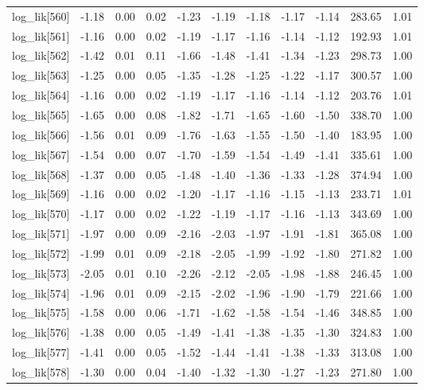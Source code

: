 \begin{table}[ht]
\begin{tabular}{rrrrrrrrrrr}
  log\_lik[560] & -1.18 & 0.00 & 0.02 & -1.23 & -1.19 & -1.18 & -1.17 & -1.14 & 283.65 & 1.01 \\ 
  log\_lik[561] & -1.16 & 0.00 & 0.02 & -1.19 & -1.17 & -1.16 & -1.14 & -1.12 & 192.93 & 1.01 \\ 
  log\_lik[562] & -1.42 & 0.01 & 0.11 & -1.66 & -1.48 & -1.41 & -1.34 & -1.23 & 298.73 & 1.00 \\ 
  log\_lik[563] & -1.25 & 0.00 & 0.05 & -1.35 & -1.28 & -1.25 & -1.22 & -1.17 & 300.57 & 1.00 \\ 
  log\_lik[564] & -1.16 & 0.00 & 0.02 & -1.19 & -1.17 & -1.16 & -1.14 & -1.12 & 203.76 & 1.01 \\ 
  log\_lik[565] & -1.65 & 0.00 & 0.08 & -1.82 & -1.71 & -1.65 & -1.60 & -1.50 & 338.70 & 1.00 \\ 
  log\_lik[566] & -1.56 & 0.01 & 0.09 & -1.76 & -1.63 & -1.55 & -1.50 & -1.40 & 183.95 & 1.00 \\ 
  log\_lik[567] & -1.54 & 0.00 & 0.07 & -1.70 & -1.59 & -1.54 & -1.49 & -1.41 & 335.61 & 1.00 \\ 
  log\_lik[568] & -1.37 & 0.00 & 0.05 & -1.48 & -1.40 & -1.36 & -1.33 & -1.28 & 374.94 & 1.00 \\ 
  log\_lik[569] & -1.16 & 0.00 & 0.02 & -1.20 & -1.17 & -1.16 & -1.15 & -1.13 & 233.71 & 1.01 \\ 
  log\_lik[570] & -1.17 & 0.00 & 0.02 & -1.22 & -1.19 & -1.17 & -1.16 & -1.13 & 343.69 & 1.00 \\ 
  log\_lik[571] & -1.97 & 0.00 & 0.09 & -2.16 & -2.03 & -1.97 & -1.91 & -1.81 & 365.08 & 1.00 \\ 
  log\_lik[572] & -1.99 & 0.01 & 0.09 & -2.18 & -2.05 & -1.99 & -1.92 & -1.80 & 271.82 & 1.00 \\ 
  log\_lik[573] & -2.05 & 0.01 & 0.10 & -2.26 & -2.12 & -2.05 & -1.98 & -1.88 & 246.45 & 1.00 \\ 
  log\_lik[574] & -1.96 & 0.01 & 0.09 & -2.15 & -2.02 & -1.96 & -1.90 & -1.79 & 221.66 & 1.00 \\ 
  log\_lik[575] & -1.58 & 0.00 & 0.06 & -1.71 & -1.62 & -1.58 & -1.54 & -1.46 & 348.85 & 1.00 \\ 
  log\_lik[576] & -1.38 & 0.00 & 0.05 & -1.49 & -1.41 & -1.38 & -1.35 & -1.30 & 324.83 & 1.00 \\ 
  log\_lik[577] & -1.41 & 0.00 & 0.05 & -1.52 & -1.44 & -1.41 & -1.38 & -1.33 & 313.08 & 1.00 \\ 
  log\_lik[578] & -1.30 & 0.00 & 0.04 & -1.40 & -1.32 & -1.30 & -1.27 & -1.23 & 271.80 & 1.00 \\ 

\end{tabular}
\end{table}
